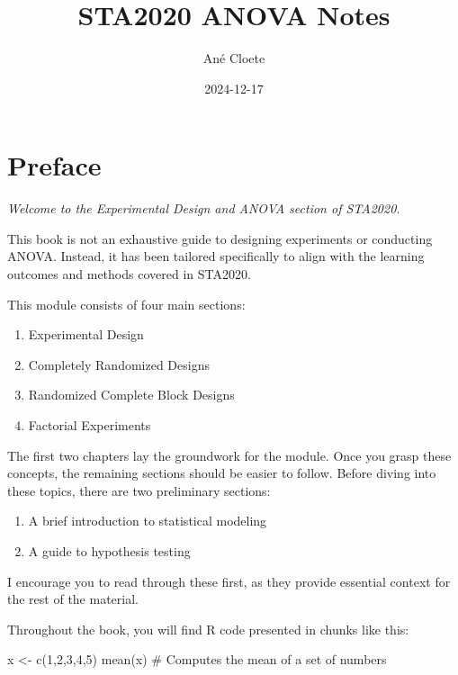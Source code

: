 \documentclass[
  letterpaper,
]{book}
\title{STA2020 ANOVA Notes}
\author{Ané Cloete}
\date{2024-12-17}
\newenvironment{Shaded}{\begin{snugshade}}{\end{snugshade}}
\newcommand{\CommentTok}[1]{\textcolor[rgb]{0.37,0.37,0.37}{#1}}
\newcommand{\DecValTok}[1]{\textcolor[rgb]{0.68,0.00,0.00}{#1}}
\newcommand{\FunctionTok}[1]{\textcolor[rgb]{0.28,0.35,0.67}{#1}}
\newcommand{\NormalTok}[1]{\textcolor[rgb]{0.00,0.23,0.31}{#1}}
\newcommand{\OtherTok}[1]{\textcolor[rgb]{0.00,0.23,0.31}{#1}}
\providecommand{\tightlist}{%
  \setlength{\itemsep}{0pt}\setlength{\parskip}{0pt}}\usepackage{longtable,booktabs,array}
\renewcommand*\contentsname{Table of contents}
\newcommand\contentsname{Table of contents}
\begin{document}
\frontmatter
\maketitle

\renewcommand*\contentsname{Table of contents}
{
\setcounter{tocdepth}{2}
\tableofcontents
}

\mainmatter
{}

\chapter*{Preface}\label{preface}


\emph{Welcome to the Experimental Design and ANOVA section of STA2020.}

This book is not an exhaustive guide to designing experiments or
conducting ANOVA. Instead, it has been tailored specifically to align
with the learning outcomes and methods covered in STA2020.

This module consists of four main sections:

\begin{enumerate}
\def\labelenumi{\arabic{enumi}.}
\tightlist
\item
  Experimental Design
\item
  Completely Randomized Designs
\item
  Randomized Complete Block Designs
\item
  Factorial Experiments
\end{enumerate}

The first two chapters lay the groundwork for the module. Once you grasp
these concepts, the remaining sections should be easier to follow.
Before diving into these topics, there are two preliminary sections:

\begin{enumerate}
\def\labelenumi{\arabic{enumi}.}
\tightlist
\item
  A brief introduction to statistical modeling
\item
  A guide to hypothesis testing
\end{enumerate}

I encourage you to read through these first, as they provide essential
context for the rest of the material.

Throughout the book, you will find R code presented in chunks like this:

\begin{Shaded}
\begin{Highlighting}[]
\NormalTok{x }\OtherTok{\textless{}{-}} \FunctionTok{c}\NormalTok{(}\DecValTok{1}\NormalTok{,}\DecValTok{2}\NormalTok{,}\DecValTok{3}\NormalTok{,}\DecValTok{4}\NormalTok{,}\DecValTok{5}\NormalTok{)}
\FunctionTok{mean}\NormalTok{(x) }\CommentTok{\# Computes the mean of a set of numbers  }
\end{Highlighting}
\end{Shaded}
\end{document}
